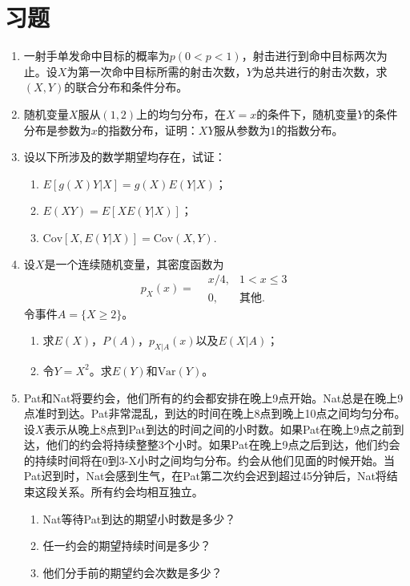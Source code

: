 \section{习题}
    \begin{enumerate}
        \item 一射手单发命中目标的概率为$p(0 < p < 1)$，射击进行到命中目标两次为止。设$X$为第一次命中目标所需的射击次数，$Y$为总共进行的射击次数，求$(X,Y)$的联合分布和条件分布。
        \item 随机变量$X$服从$(1,2)$上的均匀分布，在$X=x$的条件下，随机变量$Y$的条件分布是参数为$x$的指数分布，证明：$XY$服从参数为1的指数分布。
        \item 设以下所涉及的数学期望均存在，试证：
        \begin{enumerate}
            \item $E[g(X)Y|X] = g(X)E(Y|X)$；
            \item $E(XY) = E[XE(Y|X)]$；
            \item $\text{Cov}[X,E(Y|X)] = \text{Cov}(X,Y).$
        \end{enumerate}


\item 设$X$是一个连续随机变量，其密度函数为
$$
p_X(x) = \begin{aligned}
    &x/4, &1< x\leq 3\\
&0, &\text{其他}.
\end{aligned}
$$
令事件$A = \{X\geq 2\}$。
\begin{enumerate}
    \item 求$E(X)$，$P(A)$，$p_{X|A}(x)$以及$E(X|A)$；
    \item 令$Y = X^2$。求$E(Y)$和$\text{Var}(Y)$。
\end{enumerate}

\item Pat和Nat将要约会，他们所有的约会都安排在晚上9点开始。Nat总是在晚上9点准时到达。Pat非常混乱，到达的时间在晚上8点到晚上10点之间均匀分布。设$X$表示从晚上8点到Pat到达的时间之间的小时数。如果Pat在晚上9点之前到达，他们的约会将持续整整3个小时。如果Pat在晚上9点之后到达，他们约会的持续时间将在0到3-X小时之间均匀分布。约会从他们见面的时候开始。当Pat迟到时，Nat会感到生气，在Pat第二次约会迟到超过45分钟后，Nat将结束这段关系。所有约会均相互独立。
\begin{enumerate}
    \item Nat等待Pat到达的期望小时数是多少？
    \item 任一约会的期望持续时间是多少？
    \item 他们分手前的期望约会次数是多少？
\end{enumerate}
    \end{enumerate}


